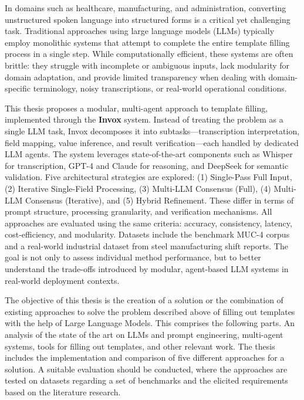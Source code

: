 In domains such as healthcare, manufacturing, and administration, converting unstructured spoken language into structured forms is a critical yet challenging task. Traditional approaches using large language models (LLMs) typically employ monolithic systems that attempt to complete the entire template filling process in a single step. While computationally efficient, these systems are often brittle: they struggle with incomplete or ambiguous inputs, lack modularity for domain adaptation, and provide limited transparency when dealing with domain-specific terminology, noisy transcriptions, or real-world operational conditions.


This thesis proposes a modular, multi-agent approach to template filling, implemented through the \textbf{Invox} system. Instead of treating the problem as a single LLM task, Invox decomposes it into subtasks—transcription interpretation, field mapping, value inference, and result verification—each handled by dedicated LLM agents. The system leverages state-of-the-art components such as Whisper for transcription, GPT-4 and Claude for reasoning, and DeepSeek for semantic validation. Five architectural strategies are explored: (1) Single-Pass Full Input, (2) Iterative Single-Field Processing, (3) Multi-LLM Consensus (Full), (4) Multi-LLM Consensus (Iterative), and (5) Hybrid Refinement. These differ in terms of prompt structure, processing granularity, and verification mechanisms. All approaches are evaluated using the same criteria: accuracy, consistency, latency, cost-efficiency, and modularity. Datasets include the benchmark MUC-4 corpus and a real-world industrial dataset from steel manufacturing shift reports. The goal is not only to assess individual method performance, but to better understand the trade-offs introduced by modular, agent-based LLM systems in real-world deployment contexts.


The objective of this thesis is the creation of a solution or the combination of existing approaches to solve the problem described above of filling out templates with the help of Large Language Models. This comprises the following parts. An analysis of the state of the art on LLMs and prompt engineering, multi-agent systems, tools for filling out templates, and other relevant work. The thesis includes the implementation and comparison of five different approaches for a solution. A suitable evaluation should be conducted, where the approaches are tested on datasets regarding a set of benchmarks and the elicited requirements based on the literature research.
